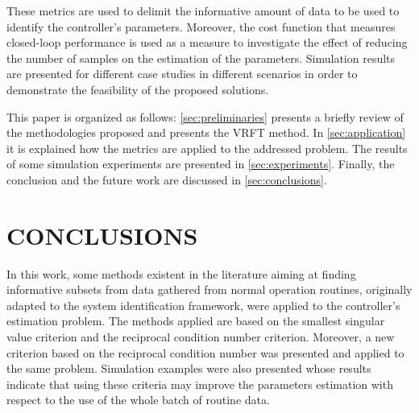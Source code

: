 \documentclass[letterpaper, 10 pt, conference]{ieeeconf}  %
\begin{document}




These metrics  are used to delimit the informative amount of data to be used to identify the controller's parameters.
Moreover, the cost function that measures closed-loop performance is used as a measure to investigate the effect of reducing the number of samples on the estimation of the parameters.
Simulation results are presented for different case studies in different scenarios in order to demonstrate the feasibility of the proposed solutions.

This paper is organized as follows: \autoref{sec:preliminaries} presents a briefly review of the methodologies proposed and presents the VRFT method.
In \autoref{sec:application} it is explained how the metrics are applied to the addressed problem.
The results of some simulation experiments are presented in \autoref{sec:experiments}.
Finally, the conclusion and the future work are discussed in \autoref{sec:conclusions}.








\section{\label{sec:conclusions} CONCLUSIONS}

In this work, some methods existent in the literature aiming at finding informative subsets from data gathered from normal operation routines, originally adapted to the system identification framework, were applied to the controller's estimation problem.
The methods applied are based on the smallest singular value criterion and the reciprocal condition number criterion.
Moreover, a new criterion based on the reciprocal condition number was presented and applied to the same problem.
Simulation examples were also presented whose results indicate that using these criteria may improve the parameters estimation with respect to the use of the whole batch of routine data.
\end{document}
